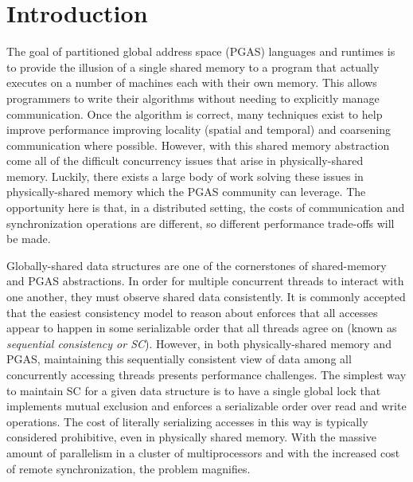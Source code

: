 \section{Introduction}

The goal of partitioned global address space (PGAS) languages and runtimes is to provide the illusion of a single shared memory to a program that actually executes on a number of machines each with their own memory. This allows programmers to write their algorithms without needing to explicitly manage communication. Once the algorithm is correct, many techniques exist to help improve performance improving locality (spatial and temporal) and coarsening communication where possible. However, with this shared memory abstraction come all of the difficult concurrency issues that arise in physically-shared memory. Luckily, there exists a large body of work solving these issues in physically-shared memory which the PGAS community can leverage. The opportunity here is that, in a distributed setting, the costs of communication and synchronization operations are different, so different performance trade-offs will be made.

Globally-shared data structures are one of the cornerstones of shared-memory and PGAS abstractions. 
In order for multiple concurrent threads to interact with one another, they must observe shared data consistently. It is commonly accepted that the easiest consistency model to reason about enforces that all accesses appear to happen in some serializable order that all threads agree on (known as \emph{sequential consistency or SC}).
However, in both physically-shared memory and PGAS, maintaining this sequentially consistent view of data among all concurrently accessing threads presents performance challenges.
The simplest way to maintain SC for a given data structure is to have a single global lock that implements mutual exclusion and enforces a serializable order over read and write operations. The cost of literally serializing accesses in this way is typically considered prohibitive, even in physically shared memory.
With the massive amount of parallelism in a cluster of multiprocessors and with the increased cost of remote synchronization, the problem magnifies.

